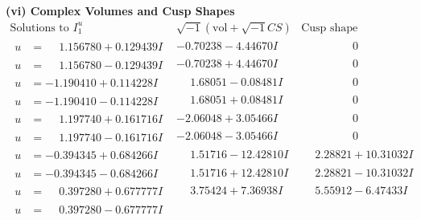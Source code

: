\documentclass[1p]{elsarticle_modified}
\theoremstyle{definition}
\newcommand{\I}{\sqrt{-1}}
\begin{document}
\newpage\flushleft \textbf{(vi) Complex Volumes and Cusp Shapes}
$$\begin{array}{c|c|c}  
\text{Solutions to }I^u_{1}& \I (\text{vol} + \sqrt{-1}CS) & \text{Cusp shape}\\
 \hline 
\begin{aligned}
u &= \phantom{-}1.156780 + 0.129439 I\end{aligned}
 & -0.70238 - 4.44670 I & \phantom{-0.000000 } 0 \\ \hline\begin{aligned}
u &= \phantom{-}1.156780 - 0.129439 I\end{aligned}
 & -0.70238 + 4.44670 I & \phantom{-0.000000 } 0 \\ \hline\begin{aligned}
u &= -1.190410 + 0.114228 I\end{aligned}
 & \phantom{-}1.68051 - 0.08481 I & \phantom{-0.000000 } 0 \\ \hline\begin{aligned}
u &= -1.190410 - 0.114228 I\end{aligned}
 & \phantom{-}1.68051 + 0.08481 I & \phantom{-0.000000 } 0 \\ \hline\begin{aligned}
u &= \phantom{-}1.197740 + 0.161716 I\end{aligned}
 & -2.06048 + 3.05466 I & \phantom{-0.000000 } 0 \\ \hline\begin{aligned}
u &= \phantom{-}1.197740 - 0.161716 I\end{aligned}
 & -2.06048 - 3.05466 I & \phantom{-0.000000 } 0 \\ \hline\begin{aligned}
u &= -0.394345 + 0.684266 I\end{aligned}
 & \phantom{-}1.51716 - 12.42810 I & \phantom{-}2.28821 + 10.31032 I \\ \hline\begin{aligned}
u &= -0.394345 - 0.684266 I\end{aligned}
 & \phantom{-}1.51716 + 12.42810 I & \phantom{-}2.28821 - 10.31032 I \\ \hline\begin{aligned}
u &= \phantom{-}0.397280 + 0.677777 I\end{aligned}
 & \phantom{-}3.75424 + 7.36938 I & \phantom{-}5.55912 - 6.47433 I \\ \hline\begin{aligned}
u &= \phantom{-}0.397280 - 0.677777 I\end{aligned}

\end{array}$$
\end{document}
